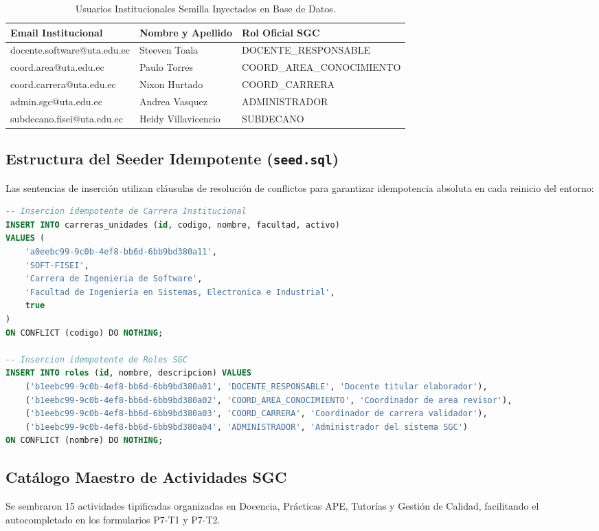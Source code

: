 \documentclass[12pt,a4paper]{article}
\begin{document}
\begin{table}[htbp]
\centering
\small
\renewcommand{\arraystretch}{1.15}
\begin{tabularx}{\textwidth}{|l|l|X|}
\hline
\rowcolor{tableheader}
\textbf{Email Institucional} & \textbf{Nombre y Apellido} & \textbf{Rol Oficial SGC} \\
\hline
docente.software@uta.edu.ec & Steeven Toala & DOCENTE\_RESPONSABLE \\
\hline
coord.area@uta.edu.ec & Paulo Torres & COORD\_AREA\_CONOCIMIENTO \\
\hline
coord.carrera@uta.edu.ec & Nixon Hurtado & COORD\_CARRERA \\
\hline
admin.sgc@uta.edu.ec & Andrea Vasquez & ADMINISTRADOR \\
\hline
subdecano.fisei@uta.edu.ec & Heidy Villavicencio & SUBDECANO \\
\hline
\end{tabularx}
\caption{Usuarios Institucionales Semilla Inyectados en Base de Datos.}
\end{table}

\subsection{Estructura del Seeder Idempotente (\texttt{seed.sql})}
Las sentencias de inserción utilizan cláusulas de resolución de conflictos para garantizar idempotencia absoluta en cada reinicio del entorno:
\begin{lstlisting}[language=SQL]
-- Insercion idempotente de Carrera Institucional
INSERT INTO carreras_unidades (id, codigo, nombre, facultad, activo)
VALUES (
    'a0eebc99-9c0b-4ef8-bb6d-6bb9bd380a11',
    'SOFT-FISEI',
    'Carrera de Ingenieria de Software',
    'Facultad de Ingenieria en Sistemas, Electronica e Industrial',
    true
)
ON CONFLICT (codigo) DO NOTHING;

-- Insercion idempotente de Roles SGC
INSERT INTO roles (id, nombre, descripcion) VALUES
    ('b1eebc99-9c0b-4ef8-bb6d-6bb9bd380a01', 'DOCENTE_RESPONSABLE', 'Docente titular elaborador'),
    ('b1eebc99-9c0b-4ef8-bb6d-6bb9bd380a02', 'COORD_AREA_CONOCIMIENTO', 'Coordinador de area revisor'),
    ('b1eebc99-9c0b-4ef8-bb6d-6bb9bd380a03', 'COORD_CARRERA', 'Coordinador de carrera validador'),
    ('b1eebc99-9c0b-4ef8-bb6d-6bb9bd380a04', 'ADMINISTRADOR', 'Administrador del sistema SGC')
ON CONFLICT (nombre) DO NOTHING;
\end{lstlisting}

\subsection{Catálogo Maestro de Actividades SGC}
Se sembraron 15 actividades tipificadas organizadas en Docencia, Prácticas APE, Tutorías y Gestión de Calidad, facilitando el autocompletado en los formularios P7-T1 y P7-T2.
\end{document}
